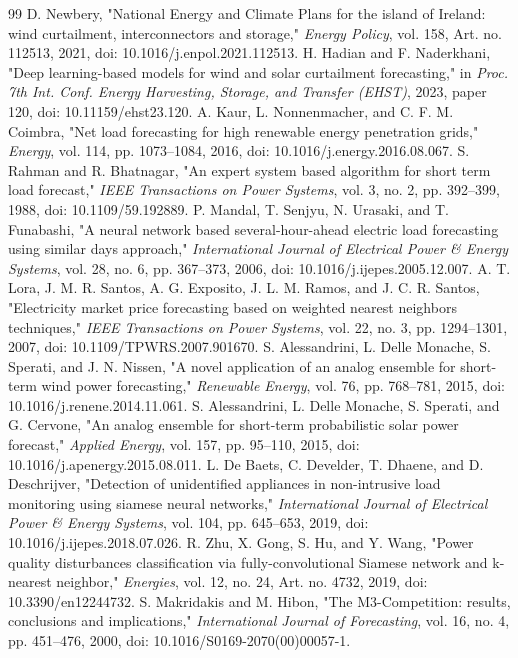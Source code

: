 \documentclass{ieeeaccess}
\begin{document}
\begin{thebibliography}{99}
 D. Newbery, "National Energy and Climate Plans for the island of Ireland: wind curtailment, interconnectors and storage," \emph{Energy Policy}, vol. 158, Art. no. 112513, 2021, doi: 10.1016/j.enpol.2021.112513.
 H. Hadian and F. Naderkhani, "Deep learning-based models for wind and solar curtailment forecasting," in \emph{Proc. 7th Int. Conf. Energy Harvesting, Storage, and Transfer (EHST)}, 2023, paper 120, doi: 10.11159/ehst23.120.
 A. Kaur, L. Nonnenmacher, and C. F. M. Coimbra, "Net load forecasting for high renewable energy penetration grids," \emph{Energy}, vol. 114, pp. 1073--1084, 2016, doi: 10.1016/j.energy.2016.08.067.
 S. Rahman and R. Bhatnagar, "An expert system based algorithm for short term load forecast," \emph{IEEE Transactions on Power Systems}, vol. 3, no. 2, pp. 392--399, 1988, doi: 10.1109/59.192889.
 P. Mandal, T. Senjyu, N. Urasaki, and T. Funabashi, "A neural network based several-hour-ahead electric load forecasting using similar days approach," \emph{International Journal of Electrical Power \& Energy Systems}, vol. 28, no. 6, pp. 367--373, 2006, doi: 10.1016/j.ijepes.2005.12.007.
 A. T. Lora, J. M. R. Santos, A. G. Exposito, J. L. M. Ramos, and J. C. R. Santos, "Electricity market price forecasting based on weighted nearest neighbors techniques," \emph{IEEE Transactions on Power Systems}, vol. 22, no. 3, pp. 1294--1301, 2007, doi: 10.1109/TPWRS.2007.901670.
 S. Alessandrini, L. Delle Monache, S. Sperati, and J. N. Nissen, "A novel application of an analog ensemble for short-term wind power forecasting," \emph{Renewable Energy}, vol. 76, pp. 768--781, 2015, doi: 10.1016/j.renene.2014.11.061.
 S. Alessandrini, L. Delle Monache, S. Sperati, and G. Cervone, "An analog ensemble for short-term probabilistic solar power forecast," \emph{Applied Energy}, vol. 157, pp. 95--110, 2015, doi: 10.1016/j.apenergy.2015.08.011.
 L. De Baets, C. Develder, T. Dhaene, and D. Deschrijver, "Detection of unidentified appliances in non-intrusive load monitoring using siamese neural networks," \emph{International Journal of Electrical Power \& Energy Systems}, vol. 104, pp. 645--653, 2019, doi: 10.1016/j.ijepes.2018.07.026.
 R. Zhu, X. Gong, S. Hu, and Y. Wang, "Power quality disturbances classification via fully-convolutional Siamese network and k-nearest neighbor," \emph{Energies}, vol. 12, no. 24, Art. no. 4732, 2019, doi: 10.3390/en12244732.
 S. Makridakis and M. Hibon, "The M3-Competition: results, conclusions and implications," \emph{International Journal of Forecasting}, vol. 16, no. 4, pp. 451--476, 2000, doi: 10.1016/S0169-2070(00)00057-1.

\end{thebibliography}
\end{document}
